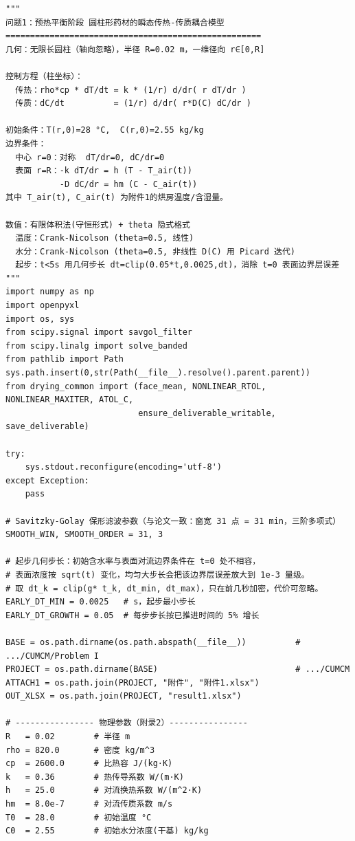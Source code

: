 \documentclass[12pt,a4paper]{ctexart}
\begin{document}
\begin{lstlisting}[caption={solve\_problem1.py }]
"""
问题1：预热平衡阶段 圆柱形药材的瞬态传热-传质耦合模型
====================================================
几何：无限长圆柱（轴向忽略），半径 R=0.02 m，一维径向 r∈[0,R]

控制方程（柱坐标）：
  传热：rho*cp * dT/dt = k * (1/r) d/dr( r dT/dr )
  传质：dC/dt          = (1/r) d/dr( r*D(C) dC/dr )

初始条件：T(r,0)=28 °C,  C(r,0)=2.55 kg/kg
边界条件：
  中心 r=0：对称  dT/dr=0, dC/dr=0
  表面 r=R：-k dT/dr = h (T - T_air(t))
           -D dC/dr = hm (C - C_air(t))
其中 T_air(t), C_air(t) 为附件1的烘房温度/含湿量。

数值：有限体积法(守恒形式) + theta 隐式格式
  温度：Crank-Nicolson (theta=0.5, 线性)
  水分：Crank-Nicolson (theta=0.5, 非线性 D(C) 用 Picard 迭代)
  起步：t<5s 用几何步长 dt=clip(0.05*t,0.0025,dt)，消除 t=0 表面边界层误差
"""
import numpy as np
import openpyxl
import os, sys
from scipy.signal import savgol_filter
from scipy.linalg import solve_banded
from pathlib import Path
sys.path.insert(0,str(Path(__file__).resolve().parent.parent))
from drying_common import (face_mean, NONLINEAR_RTOL, NONLINEAR_MAXITER, ATOL_C,
                           ensure_deliverable_writable, save_deliverable)

try:
    sys.stdout.reconfigure(encoding='utf-8')
except Exception:
    pass

# Savitzky-Golay 保形滤波参数（与论文一致：窗宽 31 点 = 31 min，三阶多项式）
SMOOTH_WIN, SMOOTH_ORDER = 31, 3

# 起步几何步长：初始含水率与表面对流边界条件在 t=0 处不相容，
# 表面浓度按 sqrt(t) 变化，均匀大步长会把该边界层误差放大到 1e-3 量级。
# 取 dt_k = clip(g* t_k, dt_min, dt_max)，只在前几秒加密，代价可忽略。
EARLY_DT_MIN = 0.0025   # s，起步最小步长
EARLY_DT_GROWTH = 0.05  # 每步步长按已推进时间的 5% 增长

BASE = os.path.dirname(os.path.abspath(__file__))          # .../CUMCM/Problem I
PROJECT = os.path.dirname(BASE)                            # .../CUMCM
ATTACH1 = os.path.join(PROJECT, "附件", "附件1.xlsx")
OUT_XLSX = os.path.join(PROJECT, "result1.xlsx")

# ---------------- 物理参数（附录2）----------------
R   = 0.02        # 半径 m
rho = 820.0       # 密度 kg/m^3
cp  = 2600.0      # 比热容 J/(kg·K)
k   = 0.36        # 热传导系数 W/(m·K)
h   = 25.0        # 对流换热系数 W/(m^2·K)
hm  = 8.0e-7      # 对流传质系数 m/s
T0  = 28.0        # 初始温度 °C
C0  = 2.55        # 初始水分浓度(干基) kg/kg



\end{lstlisting}
\end{document}
